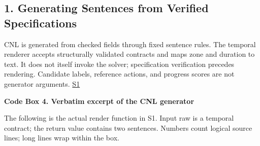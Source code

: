 \documentclass[11pt,a4paper]{article}
\begin{document}
\subsection*{1. Generating Sentences from Verified Specifications}

CNL is generated from checked fields through fixed sentence rules. The temporal renderer accepts structurally validated contracts and maps zone and duration to text. It does not itself invoke the solver; specification verification precedes rendering. Candidate labels, reference actions, and progress scores are not generator arguments. \href{\detokenize{../../../../../../projects/04-guardsynth-coc/experiments/paper1_cnl_learning/temporal_preservation.py}}{S1}\par

\par\medskip\noindent\begin{minipage}{\linewidth}
\textbf{Code Box 4. Verbatim excerpt of the CNL generator}\par

The following is the actual render function in S1. Input raw is a temporal contract; the return value contains two sentences. Numbers count logical source lines; long lines wrap within the box.\par


\end{minipage}
\end{document}
